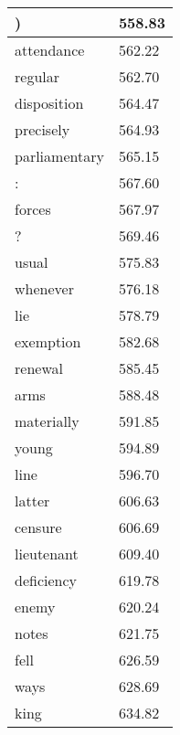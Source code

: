 \documentclass{article}
\begin{document}
\begin{longtable}[c]{ll}
\multicolumn{1}{l|}{)}               & 558.83  \\ \hline
\multicolumn{1}{l|}{attendance}      & 562.22  \\ \hline
\multicolumn{1}{l|}{regular}         & 562.70  \\ \hline
\multicolumn{1}{l|}{disposition}     & 564.47  \\ \hline
\multicolumn{1}{l|}{precisely}       & 564.93  \\ \hline
\multicolumn{1}{l|}{parliamentary}   & 565.15  \\ \hline
\multicolumn{1}{l|}{:}               & 567.60  \\ \hline
\multicolumn{1}{l|}{forces}          & 567.97  \\ \hline
\multicolumn{1}{l|}{?}               & 569.46  \\ \hline
\multicolumn{1}{l|}{usual}           & 575.83  \\ \hline
\multicolumn{1}{l|}{whenever}        & 576.18  \\ \hline
\multicolumn{1}{l|}{lie}             & 578.79  \\ \hline
\multicolumn{1}{l|}{exemption}       & 582.68  \\ \hline
\multicolumn{1}{l|}{renewal}         & 585.45  \\ \hline
\multicolumn{1}{l|}{arms}            & 588.48  \\ \hline
\multicolumn{1}{l|}{materially}      & 591.85  \\ \hline
\multicolumn{1}{l|}{young}           & 594.89  \\ \hline
\multicolumn{1}{l|}{line}            & 596.70  \\ \hline
\multicolumn{1}{l|}{latter}          & 606.63  \\ \hline
\multicolumn{1}{l|}{censure}         & 606.69  \\ \hline
\multicolumn{1}{l|}{lieutenant}      & 609.40  \\ \hline
\multicolumn{1}{l|}{deficiency}      & 619.78  \\ \hline
\multicolumn{1}{l|}{enemy}           & 620.24  \\ \hline
\multicolumn{1}{l|}{notes}           & 621.75  \\ \hline
\multicolumn{1}{l|}{fell}            & 626.59  \\ \hline
\multicolumn{1}{l|}{ways}            & 628.69  \\ \hline
\multicolumn{1}{l|}{king}            & 634.82  \\ \hline

\end{longtable}
\end{document}
